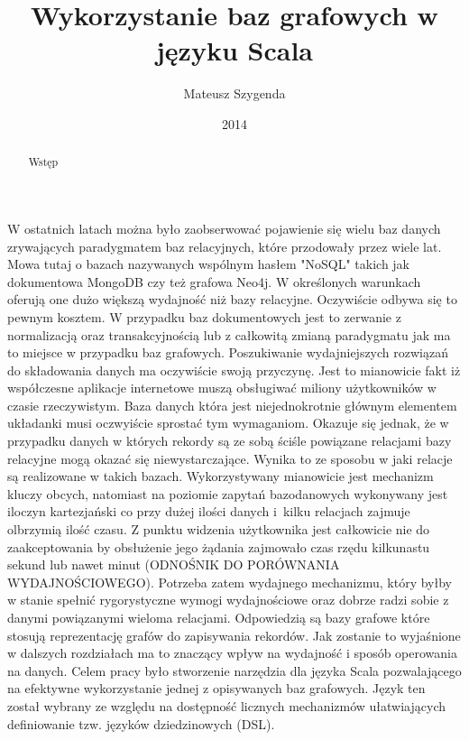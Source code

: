 \documentclass[brudnopis]{xmgr}
\author   {Mateusz Szygenda}
\title    {Wykorzystanie baz grafowych w języku Scala}
\date     {2014}
\begin{document}
\begin{abstract}
Wstęp
\end{abstract}

\maketitle

%
\introduction

W ostatnich latach można było zaobserwować pojawienie się wielu baz danych zrywających paradygmatem baz relacyjnych, które przodowały przez wiele lat. Mowa tutaj o bazach nazywanych wspólnym hasłem "NoSQL" takich jak dokumentowa MongoDB czy też grafowa Neo4j. W określonych warunkach oferują one dużo większą wydajność niż bazy relacyjne. Oczywiście odbywa się to pewnym kosztem. W przypadku baz dokumentowych jest to zerwanie z normalizacją oraz transakcyjnością lub z całkowitą zmianą paradygmatu jak ma to miejsce w przypadku baz grafowych. Poszukiwanie wydajniejszych rozwiązań do składowania danych ma oczywiście swoją przyczynę. Jest to mianowicie fakt iż współczesne aplikacje internetowe muszą obsługiwać miliony użytkowników w czasie rzeczywistym. Baza danych która jest niejednokrotnie głównym elementem układanki musi oczwyiście sprostać tym wymaganiom. Okazuje się jednak, że w przypadku danych w których rekordy są ze sobą ściśle powiązane relacjami bazy relacyjne mogą okazać się niewystarczające. Wynika to ze sposobu w jaki relacje są realizowane w takich bazach. Wykorzystywany mianowicie jest mechanizm kluczy obcych, natomiast na poziomie zapytań bazodanowych wykonywany jest iloczyn kartezjański co przy dużej ilości danych i~kilku relacjach zajmuje olbrzymią ilość czasu. Z punktu widzenia użytkownika jest całkowicie nie do zaakceptowania by obsłużenie jego żądania zajmowało czas rzędu kilkunastu sekund lub nawet minut (ODNOŚNIK DO PORÓWNANIA WYDAJNOŚCIOWEGO). Potrzeba zatem wydajnego mechanizmu, który byłby w stanie spełnić rygorystyczne wymogi wydajnościowe oraz dobrze radzi sobie z danymi powiązanymi wieloma relacjami. Odpowiedzią są bazy grafowe które stosują reprezentację grafów do zapisywania rekordów. Jak zostanie to wyjaśnione  w dalszych rozdziałach ma to znaczący wpływ na wydajność i sposób operowania na danych. Celem pracy było stworzenie narzędzia dla języka Scala pozwalającego na efektywne wykorzystanie jednej z opisywanych baz grafowych. Język ten został wybrany ze względu na dostępność licznych mechanizmów ułatwiających definiowanie tzw. języków dziedzinowych (DSL).
\end{document}
